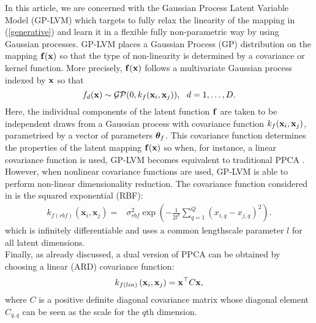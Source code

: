 In this article, we are concerned with 
the Gaussian Process Latent Variable Model (GP-LVM) \citep{GPLVM, GPLVM2} which
targets to fully relax the linearity of the mapping in (\ref{generative})
and learn it in a flexible fully non-parametric way by using Gaussian processes.    
GP-LVM places a Gaussian Process (GP) \citep{rasmussen-williams}  
distribution on the mapping $\mathbf{f}(\mathbf{x})$ so that the type of non-linearity
is determined by a covariance or kernel function. 
More precisely, $\mathbf{f}(\mathbf{x})$ follows a multivariate Gaussian process indexed by 
$\mathbf{x}$ so that 
\begin{equation}
\label{gppriorf}
f_d(\bfx)  \sim  \mathcal{GP}(0, k_f(\bfx_i,\bfx_j)), \ \ d=1,\ldots,D.
\end{equation}
Here, the individual components of the latent function $\mathbf{f}$ are taken to be independent draws from a Gaussian
process with covariance function $k_f(\mathbf{x}_i,\mathbf{x}_j)$, parametrised by a vector of parameters $\boldsymbol \theta_f$. 
This covariance function determines the properties of the latent
mapping $\mathbf{f}(\mathbf{x})$ so when, for instance, a linear covariance function is used, 
GP-LVM becomes equivalent to traditional PPCA \citep{GPLVM}. However, when nonlinear
covariance functions are used, GP-LVM is able to perform non-linear dimensionality reduction. 
The covariance function considered in  \citep{GPLVM} is the squared exponential (RBF):
\begin{align}
k_{f(rbf)} \left( \mathbf{x}_i, \mathbf{x}_j \right) = {} &  
		\sigma_{rbf}^2 \exp\left(
			- \frac{1}{2 l^2} \sum_{q=1}^{Q} \left(
                          \mathit{x_{i,q} - x_{j,q}} \right) ^2 \right).
\label{rbf}
\end{align}
\noindent which is infinitely differentiable and uses a common lengthscale
 parameter $l$ for all latent dimensions.
 \\
Finally, as already discussed, a dual version of PPCA can be obtained by choosing a linear 
(ARD) covariance function:
\begin{equation}
\label{linard}
k_{f(lin)} \left( \mathbf{x}_i, \mathbf{x}_j \right) = \mathbf{x}^{\top} C \mathbf{x},
\end{equation}
where $C$ is a positive definite diagonal covariance matrix whose diagonal element $C_{q,q}$ can be seen as the scale for the $q$th dimension.


